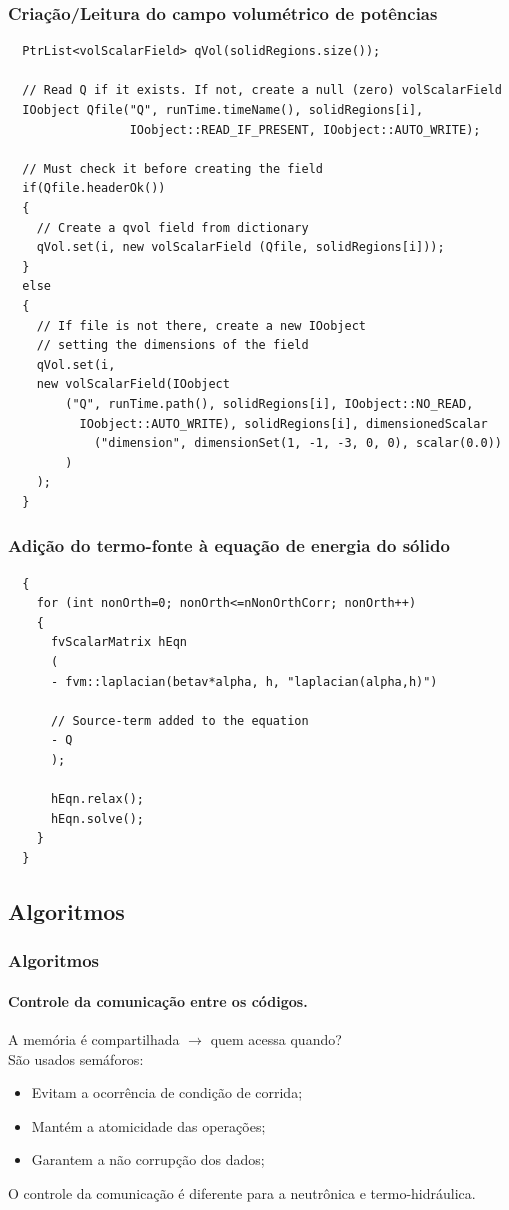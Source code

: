 \documentclass[svgnames,smaller,table]{beamer}
\begin{document}
\begin{frame}[fragile]
  \frametitle{Criação/Leitura do campo volumétrico de potências}
 \begin{lstlisting}
  PtrList<volScalarField> qVol(solidRegions.size());

  // Read Q if it exists. If not, create a null (zero) volScalarField
  IOobject Qfile("Q", runTime.timeName(), solidRegions[i],
                 IOobject::READ_IF_PRESENT, IOobject::AUTO_WRITE);

  // Must check it before creating the field
  if(Qfile.headerOk())
  {
    // Create a qvol field from dictionary
    qVol.set(i, new volScalarField (Qfile, solidRegions[i]));
  }
  else
  {
    // If file is not there, create a new IOobject
    // setting the dimensions of the field
    qVol.set(i,
    new volScalarField(IOobject
        ("Q", runTime.path(), solidRegions[i], IOobject::NO_READ,
          IOobject::AUTO_WRITE), solidRegions[i], dimensionedScalar
            ("dimension", dimensionSet(1, -1, -3, 0, 0), scalar(0.0))
        )
    );
  }
 \end{lstlisting}
\end{frame}

\begin{frame}[fragile]
  \frametitle{Adição do termo-fonte à equação de energia do sólido}
 \begin{lstlisting}
  {
    for (int nonOrth=0; nonOrth<=nNonOrthCorr; nonOrth++)
    {
      fvScalarMatrix hEqn
      (
      - fvm::laplacian(betav*alpha, h, "laplacian(alpha,h)")

      // Source-term added to the equation
      - Q
      );

      hEqn.relax();
      hEqn.solve();
    }
  }
 \end{lstlisting}
\end{frame}


\subsection{Algoritmos}
\begin{frame}
  \frametitle{Algoritmos}
  \framesubtitle{Controle da comunicação entre os códigos.}
  A memória é compartilhada $\rightarrow$ quem acessa quando?  
  \\
  \vspace{0.5cm}
  São usados semáforos:
  \begin{itemize}
  \item Evitam a ocorrência de condição de corrida;
  \item Mantém a atomicidade das operações;
  \item Garantem a não corrupção dos dados;
  \end{itemize}
  \vspace{0.5cm}
  O controle da comunicação é diferente para a neutrônica e termo-hidráulica.
\end{frame}
\end{document}
